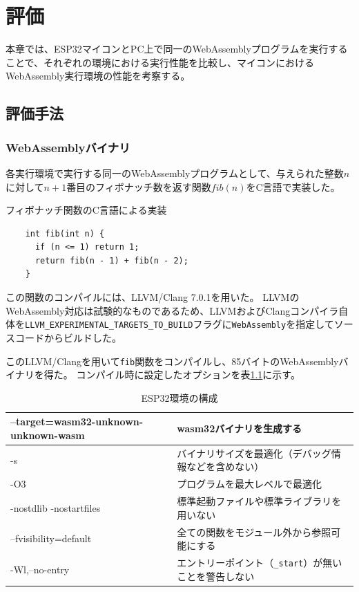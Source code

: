 \chapter{評価}
\label{chap:evaluation}

本章では、ESP32マイコンとPC上で同一のWebAssemblyプログラムを実行することで、それぞれの環境における実行性能を比較し、マイコンにおけるWebAssembly実行環境の性能を考察する。

\section{評価手法}

\subsection{WebAssemblyバイナリ}
\label{subsec:wasm}

各実行環境で実行する同一のWebAssemblyプログラムとして、与えられた整数$n$に対して$n+1$番目のフィボナッチ数を返す関数$fib(n)$をC言語で実装した。

\begin{itembox}[l]{フィボナッチ関数のC言語による実装}
  \begin{verbatim}
    int fib(int n) {
      if (n <= 1) return 1;
      return fib(n - 1) + fib(n - 2);
    }
  \end{verbatim}
\end{itembox}

この関数のコンパイルには、LLVM/Clang 7.0.1を用いた。
LLVMのWebAssembly対応は試験的なものであるため、LLVMおよびClangコンパイラ自体を{\tt LLVM\_EXPERIMENTAL\_TARGETS\_TO\_BUILD}フラグに{\tt WebAssembly}を指定してソースコードからビルドした。

このLLVM/Clangを用いて{\tt fib}関数をコンパイルし、85バイトのWebAssemblyバイナリを得た。
コンパイル時に設定したオプションを表\ref{tab:compiler}に示す。

\begin{table}[htbp]
  \label{tab:compiler}
  \caption{ESP32環境の構成}
  \begin{center}
    \begin{tabular}{|l|l|}
    \hline
    --target=wasm32-unknown-unknown-wasm & wasm32バイナリを生成する \\ \hline
    -s & バイナリサイズを最適化（デバッグ情報などを含めない） \\ \hline
    -O3 & プログラムを最大レベルで最適化 \\ \hline
    -nostdlib -nostartfiles & 標準起動ファイルや標準ライブラリを用いない \\ \hline
    --fvisibility=default & 全ての関数をモジュール外から参照可能にする \\ \hline
    -Wl,--no-entry & エントリーポイント（{\tt \_start}）が無いことを警告しない \\ \hline
    \end{tabular}
  \end{center}
\end{table}

